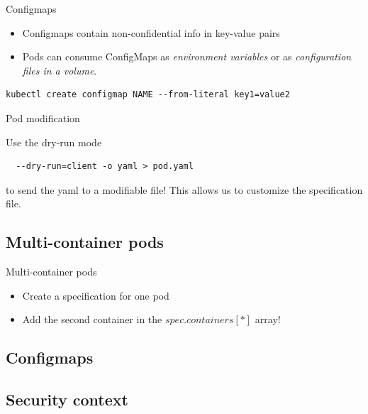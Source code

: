 \documentclass{beamer}
\begin{document}
\begin{frame}[fragile]{Configmaps}
    
    \begin{itemize}
    \item Configmaps contain non-confidential info in key-value pairs
    \item Pods can consume ConfigMaps as \textit{environment variables} or as \textit{configuration files in a volume}.
\end{itemize}

\begin{lstlisting}
kubectl create configmap NAME --from-literal key1=value2
\end{lstlisting}
    
\end{frame}

\begin{frame}[fragile]{Pod modification}

Use the dry-run mode
\begin{lstlisting}
  --dry-run=client -o yaml > pod.yaml
\end{lstlisting}
to send the yaml to a modifiable file!
\newline \newline
This allows us to customize the specification file.

\end{frame}

\subsection{Multi-container pods}

\begin{frame}[fragile]{Multi-container pods}
\begin{itemize}
    \item Create a specification for one pod
    \item Add the second container in the $spec.containers[*]$ array!
\end{itemize}
\end{frame}

\subsection{Configmaps}

\subsection{Security context}
\end{document}
